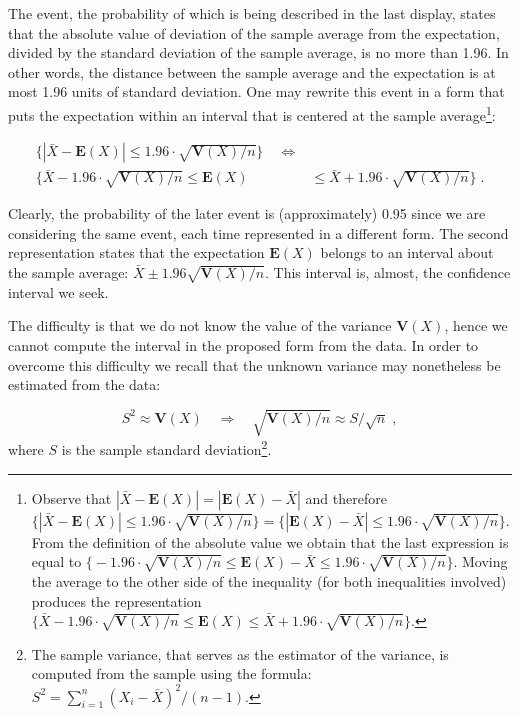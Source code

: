 \documentclass[
]{krantz}
\newcommand{\Expec}{\mathbf{E}}
\newcommand{\Var}{\mathbf{V}}
\theoremstyle{definition}
\theoremstyle{definition}
\theoremstyle{definition}
\theoremstyle{remark}
\begin{document}
The event, the probability of which is being described in the last
display, states that the absolute value of deviation of the sample
average from the expectation, divided by the standard deviation of the
sample average, is no more than 1.96. In other words, the distance
between the sample average and the expectation is at most 1.96 units of
standard deviation. One may rewrite this event in a form that puts the
expectation within an interval that is centered at the sample
average\footnote{Observe that \(|\bar X - \Expec(X)| = |\Expec(X) -\bar X |\) and
  therefore
  \(\big\{|\bar X - \Expec(X)| \leq 1.96 \cdot \sqrt{\Var(X)/n} \big\} =\big\{| \Expec(X)-\bar X | \leq 1.96 \cdot \sqrt{\Var(X)/n} \big\}\).
  From the definition of the absolute value we obtain that the last
  expression is equal to
  \(\big\{-1.96 \cdot \sqrt{\Var(X)/n} \leq \Expec(X)-\bar X \leq 1.96 \cdot \sqrt{\Var(X)/n} \big\}\).
  Moving the average to the other side of the inequality (for both
  inequalities involved) produces the representation
  \(\big\{\bar X-1.96 \cdot \sqrt{\Var(X)/n} \leq \Expec(X)\leq \bar X + 1.96 \cdot \sqrt{\Var(X)/n} \big\}\).}:

\[\begin{aligned}
\Big\{|\bar X - \Expec(X)| \leq 1.96 \cdot \sqrt{\Var(X)/n} \Big\} \quad \Longleftrightarrow & \\
 \Big\{ \bar X -1.96 \cdot\sqrt{\Var(X)/n} \leq  \Expec(X) &\leq \bar X + 1.96 \cdot \sqrt{\Var(X)/n}\Big\}\;.\end{aligned}\]

Clearly, the probability of the later event is (approximately) 0.95
since we are considering the same event, each time represented in a
different form. The second representation states that the expectation
\(\Expec(X)\) belongs to an interval about the sample average:
\(\bar X \pm 1.96 \sqrt{\Var(X)/n}\). This interval is, almost, the
confidence interval we seek.

The difficulty is that we do not know the value of the variance
\(\Var(X)\), hence we cannot compute the interval in the proposed form
from the data. In order to overcome this difficulty we recall that the
unknown variance may nonetheless be estimated from the data:

\[S^2 \approx \Var(X) \quad \Longrightarrow \quad \sqrt{\Var(X)/n} \approx S/\sqrt{n}\;,\]
where \(S\) is the sample standard deviation\footnote{The sample variance, that serves as the estimator of the variance,
  is computed from the sample using the formula:
  \(S^2 = \sum_{i=1}^n (X_i-\bar X)^2/(n-1)\).}.
\end{document}
